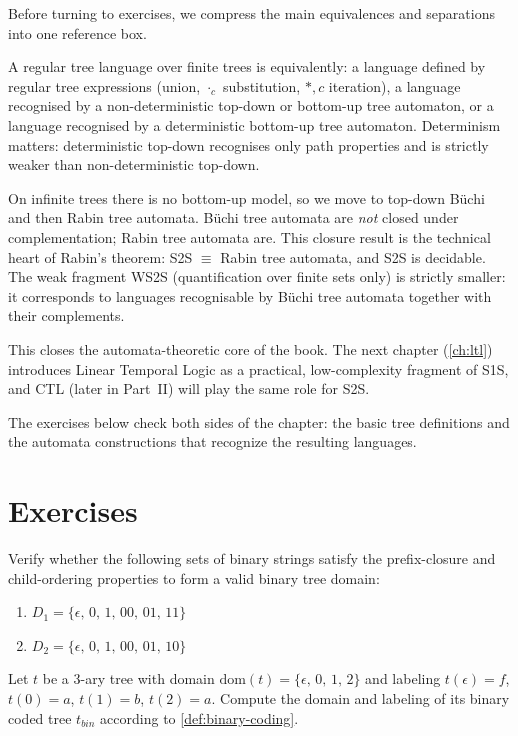Before turning to exercises, we compress the main equivalences and separations into one reference box.

\begin{summarybox}
A regular tree language over finite trees is equivalently: a language defined by regular tree expressions (union, $\cdot_c$ substitution, $*,c$ iteration), a language recognised by a non-deterministic top-down or bottom-up tree automaton, or a language recognised by a deterministic bottom-up tree automaton. Determinism matters: deterministic top-down recognises only path properties and is strictly weaker than non-deterministic top-down.

On infinite trees there is no bottom-up model, so we move to top-down Büchi and then Rabin tree automata. Büchi tree automata are \emph{not} closed under complementation; Rabin tree automata are. This closure result is the technical heart of Rabin's theorem: S2S $\equiv$ Rabin tree automata, and S2S is decidable. The weak fragment WS2S (quantification over finite sets only) is strictly smaller: it corresponds to languages recognisable by Büchi tree automata together with their complements.

This closes the automata-theoretic core of the book. The next chapter (\cref{ch:ltl}) introduces Linear Temporal Logic as a practical, low-complexity fragment of S1S, and CTL (later in Part~II) will play the same role for S2S.
\end{summarybox}

The exercises below check both sides of the chapter: the basic tree definitions and the automata constructions that recognize the resulting languages.

\section*{Exercises}

\begin{chapex}
Verify whether the following sets of binary strings satisfy the prefix-closure and child-ordering properties to form a valid binary tree domain:
\begin{enumerate}[nosep,label=(\alph*)]
  \item $D_1 = \{ \epsilon, \, 0, \, 1, \, 00, \, 01, \, 11 \}$
  \item $D_2 = \{ \epsilon, \, 0, \, 1, \, 00, \, 01, \, 10 \}$
\end{enumerate}
\end{chapex}
\begin{chapex}
Let $t$ be a 3-ary tree with domain $\text{dom}(t) = \{ \epsilon, \, 0, \, 1, \, 2 \}$ and labeling
$t(\epsilon) = f$, $t(0) = a$, $t(1) = b$, $t(2) = a$.
Compute the domain and labeling of its binary coded tree $t_{bin}$ according to \cref{def:binary-coding}.
\end{chapex}

